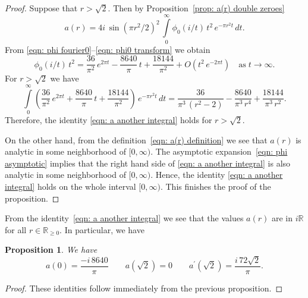 \documentclass{scrartcl}
\newcommand{\R}{\mathbb{R}}
\newtheorem{proposition}{Proposition}
\begin{document}
\begin{proof}
Suppose that $r>\sqrt{2}$. Then by Proposition~\ref{prop: a(r) double zeroes}
$$a(r)=4i\,\sin(\pi r^2/2)^2\,\int\limits_{0}^{\infty}\phi_0(i/t)\,t^2\,e^{-\pi r^2 t}\,dt. $$
From \eqref{eqn: phi fourier0}--\eqref{eqn: phi0 transform} we obtain
\begin{equation}\label{eqn: phi asymptotic}
\phi_0(i/t)\,t^2=\frac{36}{\pi^2}\,e^{2 \pi t}-\frac{8640}{\pi}\,t+\frac{18144}{\pi^2}+O(t^2\,e^{-2\pi t})\quad\mbox{as}\;t\to\infty.
\end{equation}
For $r>\sqrt{2}$ we have
\begin{equation}
\int\limits_0^\infty \left(\frac{36}{\pi^2}\,e^{2 \pi t}+\frac{8640}{\pi}\,t+\frac{18144}{\pi^2}\right)\,e^{-\pi r^2 t}\,dt
=\frac{36}{\pi^3\,(r^2-2)}-\frac{8640}{\pi^3\,r^4}+\frac{18144}{\pi^3\,r^2}.\end{equation}
Therefore, the identity \eqref{eqn: a another integral} holds for $r>\sqrt{2}$.

On the other hand, from the definition~\eqref{eqn: a(r) definition} we see that $a(r)$ is analytic in some neighborhood of $[0,\infty)$. The asymptotic expansion~\eqref{eqn: phi asymptotic} implies that the right hand side of \eqref{eqn: a another integral} is also analytic in some neighborhood of $[0,\infty)$. Hence, the identity \eqref{eqn: a another integral} holds on the whole interval $[0,\infty)$. This finishes the proof of the proposition.
\end{proof}
From the identity~\eqref{eqn: a another integral} we see that the values $a(r)$ are in $i\R$ for all $r\in\R_{\geq0}$. In particular, we have
\begin{proposition}\label{prop: a values}
We have
\begin{equation}
a(0)=\frac{-i\,8640}{\pi}\qquad
a(\sqrt{2})=0\qquad
a^\prime(\sqrt{2})=\frac{i\,72\sqrt{2}}{\pi}.
\end{equation}
\end{proposition}
\begin{proof}
These identities follow immediately from the previous proposition.
\end{proof}
\end{document}
